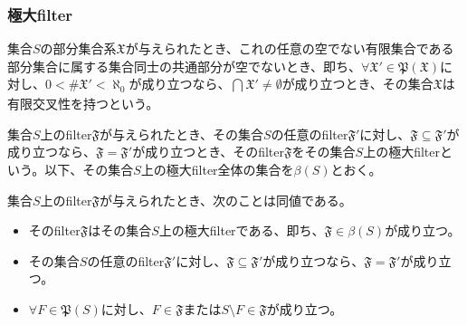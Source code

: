 \documentclass[dvipdfmx]{jsarticle}
\begin{document}
\subsubsection{極大filter}%
\begin{dfn*}
集合$S$の部分集合系$\mathfrak{X}$が与えられたとき、これの任意の空でない有限集合である部分集合に属する集合同士の共通部分が空でないとき、即ち、$\forall\mathfrak{X}'\in \mathfrak{P}\left( \mathfrak{X} \right)$に対し、$0 < {\#}\mathfrak{X}' < \aleph_{0}$が成り立つなら、$\bigcap_{} \mathfrak{X}' \neq \emptyset$が成り立つとき、その集合$\mathfrak{X}$は有限交叉性を持つという。
\end{dfn*}
\begin{dfn}
集合$S$上のfilter$\mathfrak{F}$が与えられたとき、その集合$S$の任意のfilter$\mathfrak{F}'$に対し、$\mathfrak{F \subseteq}\mathfrak{F}'$が成り立つなら、$\mathfrak{F} = \mathfrak{F}'$が成り立つとき、そのfilter$\mathfrak{F}$をその集合$S$上の極大filterという。以下、その集合$S$上の極大filter全体の集合を$\beta(S)$とおく。
\end{dfn}
\begin{thm}\label{8.1.8.5}
集合$S$上のfilter$\mathfrak{F}$が与えられたとき、次のことは同値である。
\begin{itemize}
\item
  そのfilter$\mathfrak{F}$はその集合$S$上の極大filterである、即ち、$\mathfrak{F}\in \beta(S)$が成り立つ。
\item
  その集合$S$の任意のfilter$\mathfrak{F}'$に対し、$\mathfrak{F \subseteq}\mathfrak{F}'$が成り立つなら、$\mathfrak{F} = \mathfrak{F}'$が成り立つ。
\item
  $\forall F \in \mathfrak{P}(S)$に対し、$F \in \mathfrak{F}$または$S \setminus F \in \mathfrak{F}$が成り立つ。
\end{itemize}
\end{thm}
\end{document}
